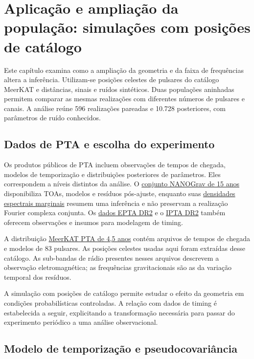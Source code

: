 \chapter{Aplicação e ampliação da população: simulações com posições de catálogo}
\label{cap:c11-parcial}

Este capítulo examina como a ampliação da geometria e da faixa de frequências altera a inferência. Utilizam-se posições celestes de pulsares do catálogo MeerKAT e distâncias, sinais e ruídos sintéticos. Duas populações aninhadas permitem comparar as mesmas realizações com diferentes números de pulsares e canais. A análise reúne 596 realizações pareadas e 10.728 posteriores, com parâmetros de ruído conhecidos.

\section{Dados de PTA e escolha do experimento}

Os produtos públicos de PTA incluem observações de tempos de chegada, modelos de temporização e distribuições posteriores de parâmetros. Eles correspondem a níveis distintos da análise. O \href{https://zenodo.org/records/16051178}{conjunto NANOGrav de 15 anos} disponibiliza TOAs, modelos e resíduos pós-ajuste, enquanto suas \href{https://zenodo.org/records/21844115}{densidades espectrais marginais} resumem uma inferência e não preservam a realização Fourier complexa conjunta. Os \href{https://zenodo.org/records/8300645}{dados EPTA DR2} e o \href{https://ipta4gw.org/data-release/}{IPTA DR2} também oferecem observações e insumos para modelagem de timing.

A distribuição \href{https://docs.datacentral.org.au/meerkat-pulsar-timing-array/45-year/accessing-the-data/}{MeerKAT PTA de 4,5 anos} contém arquivos de tempos de chegada e modelos de 83 pulsares. As posições celestes usadas aqui foram extraídas desse catálogo. As sub-bandas de rádio presentes nesses arquivos descrevem a observação eletromagnética; as frequências gravitacionais são as da variação temporal dos resíduos.

A simulação com posições de catálogo permite estudar o efeito da geometria em condições probabilísticas controladas. A relação com dados de timing é estabelecida a seguir, explicitando a transformação necessária para passar do experimento periódico a uma análise observacional.

\section{Modelo de temporização e pseudocovariância}

